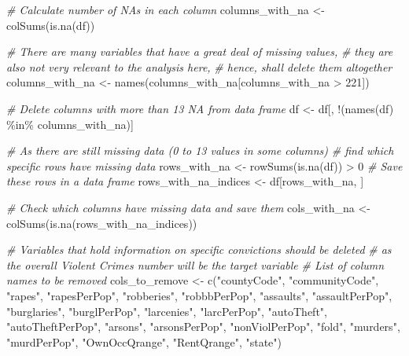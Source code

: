 \documentclass[
  11pt,
]{article}
\newenvironment{Shaded}{}{}
\newcommand{\CommentTok}[1]{\textcolor[rgb]{0.38,0.63,0.69}{\textit{#1}}}
\newcommand{\DecValTok}[1]{\textcolor[rgb]{0.25,0.63,0.44}{#1}}
\newcommand{\FunctionTok}[1]{\textcolor[rgb]{0.02,0.16,0.49}{#1}}
\newcommand{\NormalTok}[1]{#1}
\newcommand{\OtherTok}[1]{\textcolor[rgb]{0.00,0.44,0.13}{#1}}
\newcommand{\SpecialCharTok}[1]{\textcolor[rgb]{0.25,0.44,0.63}{#1}}
\newcommand{\StringTok}[1]{\textcolor[rgb]{0.25,0.44,0.63}{#1}}
\begin{document}
\begin{Shaded}
\begin{Highlighting}[]
\CommentTok{\# Calculate number of NA\textquotesingle{}s in each column}
\NormalTok{columns\_with\_na }\OtherTok{\textless{}{-}} \FunctionTok{colSums}\NormalTok{(}\FunctionTok{is.na}\NormalTok{(df))}

\CommentTok{\# There are many variables that have a great deal of missing values,}
  \CommentTok{\# they are also not very relevant to the analysis here,}
  \CommentTok{\# hence, shall delete them altogether}
\NormalTok{columns\_with\_na }\OtherTok{\textless{}{-}} \FunctionTok{names}\NormalTok{(columns\_with\_na[columns\_with\_na }\SpecialCharTok{\textgreater{}} \DecValTok{221}\NormalTok{])}

\CommentTok{\# Delete columns with more than 13 NA from data frame}
\NormalTok{df }\OtherTok{\textless{}{-}}\NormalTok{ df[, }\SpecialCharTok{!}\NormalTok{(}\FunctionTok{names}\NormalTok{(df) }\SpecialCharTok{\%in\%}\NormalTok{ columns\_with\_na)]}

\CommentTok{\# As there are still missing data (0 to 13 values in some columns) }
  \CommentTok{\# find which specific rows have missing data}
\NormalTok{rows\_with\_na }\OtherTok{\textless{}{-}} \FunctionTok{rowSums}\NormalTok{(}\FunctionTok{is.na}\NormalTok{(df)) }\SpecialCharTok{\textgreater{}} \DecValTok{0} 
\CommentTok{\# Save these rows in a data frame}
\NormalTok{rows\_with\_na\_indices }\OtherTok{\textless{}{-}}\NormalTok{ df[rows\_with\_na, ]}

\CommentTok{\# Check which columns have missing data and save them}
\NormalTok{cols\_with\_na }\OtherTok{\textless{}{-}} \FunctionTok{colSums}\NormalTok{(}\FunctionTok{is.na}\NormalTok{(rows\_with\_na\_indices))}

\CommentTok{\# Variables that hold information on specific convictions should be deleted}
  \CommentTok{\# as the overall Violent Crimes number will be the target variable}
\CommentTok{\# List of column names to be removed}
\NormalTok{cols\_to\_remove }\OtherTok{\textless{}{-}} \FunctionTok{c}\NormalTok{(}\StringTok{"countyCode"}\NormalTok{, }\StringTok{"communityCode"}\NormalTok{, }\StringTok{"rapes"}\NormalTok{, }\StringTok{"rapesPerPop"}\NormalTok{, }
                    \StringTok{"robberies"}\NormalTok{, }\StringTok{"robbbPerPop"}\NormalTok{, }\StringTok{"assaults"}\NormalTok{, }\StringTok{"assaultPerPop"}\NormalTok{, }
                    \StringTok{"burglaries"}\NormalTok{, }\StringTok{"burglPerPop"}\NormalTok{, }\StringTok{"larcenies"}\NormalTok{, }\StringTok{"larcPerPop"}\NormalTok{, }
                    \StringTok{"autoTheft"}\NormalTok{, }\StringTok{"autoTheftPerPop"}\NormalTok{, }\StringTok{"arsons"}\NormalTok{, }\StringTok{"arsonsPerPop"}\NormalTok{, }
                    \StringTok{"nonViolPerPop"}\NormalTok{, }\StringTok{"fold"}\NormalTok{, }\StringTok{"murders"}\NormalTok{, }\StringTok{"murdPerPop"}\NormalTok{, }
                    \StringTok{"OwnOccQrange"}\NormalTok{, }\StringTok{"RentQrange"}\NormalTok{, }\StringTok{"state"}\NormalTok{)}


\end{Highlighting}
\end{Shaded}
\end{document}

